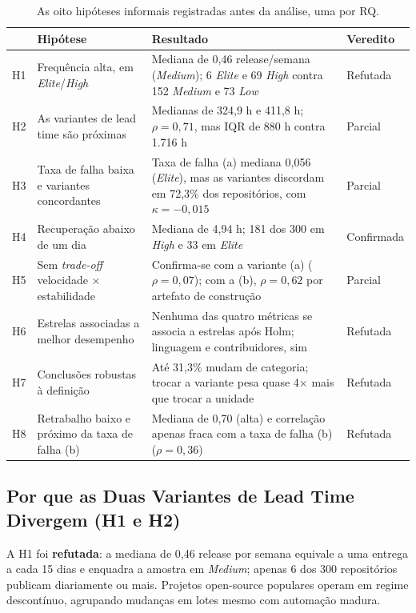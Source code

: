 \documentclass[12pt]{article}
\begin{document}
\begin{table}[ht]
\centering
\caption{As oito hipóteses informais registradas antes da análise, uma por RQ.}
\label{tab:hipoteses}
\footnotesize
\begin{tabular}{p{0.7cm}p{4.4cm}p{5.4cm}l}
\toprule
 & \textbf{Hipótese} & \textbf{Resultado} & \textbf{Veredito} \\
\midrule
H1 & Frequência alta, em \emph{Elite}/\emph{High} &
     Mediana de 0,46 release/semana (\emph{Medium}); 6 \emph{Elite} e 69
     \emph{High} contra 152 \emph{Medium} e 73 \emph{Low} & Refutada \\
H2 & As variantes de lead time são próximas &
     Medianas de 324,9 h e 411,8 h; $\rho = 0{,}71$, mas IQR de 880 h contra 1.716 h &
     Parcial \\
H3 & Taxa de falha baixa e variantes concordantes &
     Taxa de falha (a) mediana 0,056 (\emph{Elite}), mas as variantes discordam em 72,3\% dos
     repositórios, com $\kappa = -0{,}015$ & Parcial \\
H4 & Recuperação abaixo de um dia &
     Mediana de 4,94 h; 181 dos 300 em \emph{High} e 33 em \emph{Elite} &
     Confirmada \\
H5 & Sem \emph{trade-off} velocidade × estabilidade &
     Confirma-se com a variante (a) ($\rho = 0{,}07$); com a (b), $\rho = 0{,}62$ por
     artefato de construção & Parcial \\
H6 & Estrelas associadas a melhor desempenho &
     Nenhuma das quatro métricas se associa a estrelas após Holm; linguagem e
     contribuidores, sim & Refutada \\
H7 & Conclusões robustas à definição &
     Até 31,3\% mudam de categoria; trocar a variante pesa quase 4× mais que trocar a
     unidade & Refutada \\
H8 & Retrabalho baixo e próximo da taxa de falha (b) &
     Mediana de 0,70 (alta) e correlação apenas fraca com a taxa de falha (b)
     ($\rho = 0{,}36$) & Refutada \\
\bottomrule
\end{tabular}
\end{table}

\subsection{Por que as Duas Variantes de Lead Time Divergem (H1 e H2)}

A H1 foi \textbf{refutada}: a mediana de 0,46 release por semana equivale a uma entrega a
cada 15 dias e enquadra a amostra em \emph{Medium}; apenas 6 dos 300 repositórios publicam
diariamente ou mais. Projetos open-source populares operam em regime descontínuo, agrupando
mudanças em lotes mesmo com automação madura.
\end{document}
